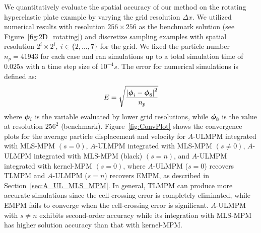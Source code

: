 We quantitatively evaluate the spatial accuracy of our method on the rotating hyperelastic plate example by varying the grid resolution $\Delta x$. We utilized numerical results with resolution $256\times 256$ as the benchmark solution (see Figure~\ref{fig:2D_rotating}) and discretize sampling examples with spatial resolution $2^i\times2^i,\:i\in\{2,\ldots,7\}$ for the grid. 
We fixed the particle number $n_p=41943$ for each case and ran simulations up to a total simulation time of $0.025s$ with a time step size of $10^{-4}s$. The error for numerical simulations is defined as:
\begin{equation}
{E}=\sqrt{\frac{\left|\boldsymbol{\phi}_{i}-\boldsymbol{\phi}_{8}\right|^2}{n_p}}
    \label{eq:error}
\end{equation}
where $\boldsymbol{\phi}_{i}$ is the variable evaluated by lower grid resolutions, while $\boldsymbol{\phi}_8$ is the value at resolution $256^2$ (benchmark). 
Figure~\ref{fig:ConvPlot} shows the convergence plots for the average particle displacement and velocity for $A$-ULMPM integrated with MLS-MPM $(s=0)$, $A$-ULMPM integrated with MLS-MPM $(s\neq 0)$, $A$-ULMPM integrated with MLS-MPM (black) $(s=n)$, and $A$-ULMPM integrated with kernel-MPM $(s=0)$, where $A$-ULMPM ($s=0$) recovers TLMPM and $A$-ULMPM ($s=n$) recovers EMPM, as described in Section~\ref{sec:A_UL_MLS_MPM}. 
In general,  TLMPM can produce more accurate simulations since the cell-crossing error is completely eliminated, while EMPM fails to converge when the cell-crossing error is significant. $A$-ULMPM with $s\neq n $ exhibits second-order accuracy while its integration with MLS-MPM has higher solution accuracy than that with kernel-MPM.
